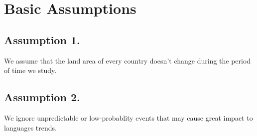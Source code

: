 \documentclass{mcmthesis}
\begin{document}


\section{Basic Assumptions}
\subsection{Assumption 1.}

  \indent \indent We assume that the land area of every country doesn't change during the period of time we study.

\subsection{Assumption 2.}

  \indent \indent We ignore unpredictable or low-probablity events that may cause great impact to languages trends.




\end{document}
